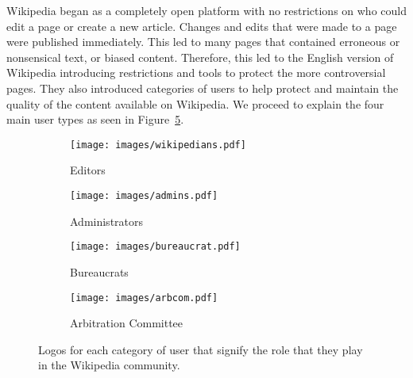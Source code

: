 Wikipedia began as a completely open platform with no restrictions on who could edit a page or create a new article.
Changes and edits that were made to a page were published immediately.
This led to many pages that contained erroneous or nonsensical text, or biased content.
Therefore, this led to the English version of Wikipedia introducing restrictions and tools to protect the more controversial pages.
They also introduced categories of users to help protect and maintain the quality of the content available on Wikipedia.
We proceed to explain the four main user types as seen in Figure~\ref{fig:logos}. 
\begin{figure}[h!]
    \centering
    \begin{subfigure}[b]{0.49\textwidth}
        \centering
        \texttt{[image: images/wikipedians.pdf]}
        \caption{Editors}
        \label{fig:editors}
    \end{subfigure}
    \begin{subfigure}[b]{0.49\textwidth}
        \centering
        \texttt{[image: images/admins.pdf]}
        \caption{Administrators}
        \label{fig:admins}
    \end{subfigure}

    \begin{subfigure}[b]{0.49\textwidth}
        \centering
        \texttt{[image: images/bureaucrat.pdf]}
        \caption{Bureaucrats}
        \label{fig:crats}
    \end{subfigure}
    \begin{subfigure}[b]{0.49\textwidth}
        \centering
        \texttt{[image: images/arbcom.pdf]}
        \caption{Arbitration Committee}
        \label{fig:arbs}
    \end{subfigure}
    \caption{Logos for each category of user that signify the role that they play in the Wikipedia community.}
    \label{fig:logos}
\end{figure}

